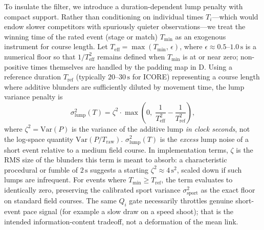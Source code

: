 \documentclass[12pt]{article}
\newcommand{\ssport}{\sigma_{\mathrm{sport}}^2}      %
\newcommand{\zetai}{\zeta^2}                    %
\newcommand{\slump}{\sigma_{\mathrm{lump}}^2}  %
\newcommand{\tref}{T_{\mathrm{ref}}}
\newcommand{\tmin}{T_{\mathrm{min}}}
\begin{document}
	To insulate the filter, we introduce a duration-dependent lump penalty with compact support. Rather than conditioning on individual times $T_i$---which would endow slower competitors with spuriously quieter observations---we treat the winning time of the rated event (stage or match) $\tmin$ as an exogenous instrument for course length. Let $T_{\mathrm{eff}} = \max(\tmin,\, \epsilon)$, where $\epsilon \approx 0.5$--$1.0\,\mathrm{s}$ is a numerical floor so that $1/T_{\mathrm{eff}}^2$ remains defined when $\tmin$ is at or near zero; non-positive times themselves are handled by the padding map in D. Using a reference duration $\tref$ (typically $20$--$30\,\mathrm{s}$ for ICORE) representing a course length where additive blunders are sufficiently diluted by movement time, the lump variance penalty is
	\begin{equation}
		\slump(T) = \zetai \cdot \max\!\left(0,\; \frac{1}{T_{\mathrm{eff}}^2} - \frac{1}{\tref^2}\right),
	\end{equation}
	where $\zetai = \mathrm{Var}(P)$ is the variance of the additive lump \emph{in clock seconds}, not the log-space quantity $\mathrm{Var}(P/T_{\mathrm{raw}})$. $\slump(T)$ is the \emph{excess} lump noise of a short event relative to a medium field course. In implementation terms, $\zeta$ is the RMS size of the blunders this term is meant to absorb: a characteristic procedural or fumble of $2\,\mathrm{s}$ suggests a starting $\zetai \approx 4\,\mathrm{s}^2$, scaled down if such lumps are infrequent. For events where $\tmin \ge \tref$, the term evaluates to identically zero, preserving the calibrated sport variance $\ssport$ as the exact floor on standard field courses. The same $Q_i$ gate necessarily throttles genuine short-event pace signal (for example a slow draw on a speed shoot); that is the intended information-content tradeoff, not a deformation of the mean link.
	
\end{document}
